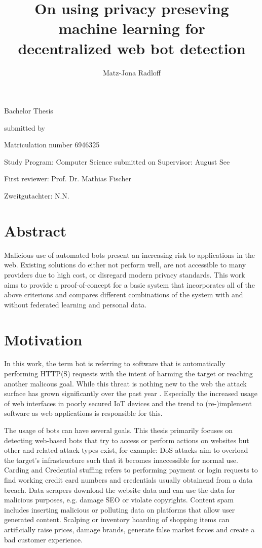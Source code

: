 \documentclass[
    fontsize=12pt,
    headings=small,
    parskip=half,           %
    bibliography=totoc,
    numbers=noenddot,       %
    open=any,               %
    final                   %
    ]{scrreprt}
\title{On using privacy preseving machine learning for\\decentralized web bot detection}
\author{Matz-Jona Radloff}
\begin{document}
\begin{titlepage}
\begin{center}\Large
	\vfill
    Bachelor Thesis
	\vfill
	\makeatletter
	{\Large\textsf{\textbf{\@title}}\par}
	\makeatother
	\vfill
    submitted by
	\par\bigskip
	\makeatletter
	{\@author} \par
	\makeatother
	Matriculation number 6946325 \par
	Study Program: Computer Science
	\vfill
	\makeatletter
	submitted on {\@date}
	\makeatother
	\vfill
	Supervisor: August See\par
	First reviewer: Prof. Dr. Mathias Fischer \par
	Zweitgutachter: N.N.
\end{center}
\end{titlepage}


\chapter*{Abstract}

Malicious use of automated bots present an increasing risk to applications in the web. Existing solutions do either not perform well, are not accessible to many providers due to high cost, or disregard modern privacy standards. This work aims to provide a proof-of-concept for a basic system that incorporates all of the above criterions and compares different combinations of the system with and without federated learning and personal data.

\tableofcontents

\chapter{Motivation}

In this work, the term bot is referring to software that is automatically performing HTTP(S) requests with the intent of harming the target or reaching another malicous goal. While this threat is nothing new to the web the attack surface has grown significantly over the past year \cite{BAD_BOT_REPORT2020,BAD_BOT_REPORT2021}. Especially the increased usage of web interfaces in poorly secured IoT devices and the trend to (re-)implement software as web applications is responsible for this.

The usage of bots can have several goals. This thesis primarily focuses on detecting web-based bots that try to access or perform actions on websites but other and related attack types exist, for example:
DoS attacks aim to overload the target's infrastructure such that it becomes inaccessible for normal use. Carding and Credential stuffing refers to performing payment or login requests to find working credit card numbers and credentials usually obtainend from a data breach. Data scrapers download the website data and can use the data for malicious purposes, e.g. damage SEO or violate copyrights. Content spam includes inserting malicious or polluting data on platforms that allow user generated content. Scalping or inventory hoarding of shopping items can artificially raise prices, damage brands, generate false market forces and create a bad customer experience.
\end{document}
